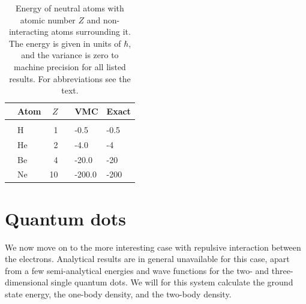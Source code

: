 \begin{table}[H]
	\caption{Energy of neutral atoms with atomic number $Z$ and non-interacting atoms surrounding it. The energy is given in units of $\hbar$, and the variance is zero to machine precision for all listed results. For abbreviations see the text.}
	\label{tab:atomswointeraction}
	\begin{tabularx}{\textwidth}{R{3.5cm}lrrR{2.5cm}R{2.5cm}} \hline\hline
		& Atom & $Z$ & \makecell{\\ \phantom{=}} & VMC & Exact \\ \hline \\
		
		& H & 1 && -0.5 & -0.5 \\
		& He & 2 && -4.0 & -4 \\
		& Be & 4 && -20.0 & -20 \\
		& Ne & 10 && -200.0 & -200 \\ \hline\hline
	\end{tabularx}
\end{table}

\cleardoublepage
\section{Quantum dots}
We now move on to the more interesting case with repulsive interaction between the electrons. Analytical results are in general unavailable for this case, apart from a few semi-analytical energies and wave functions for the two- and three-dimensional single quantum dots. We will for this system calculate the ground state energy, the one-body density, and the two-body density. 

